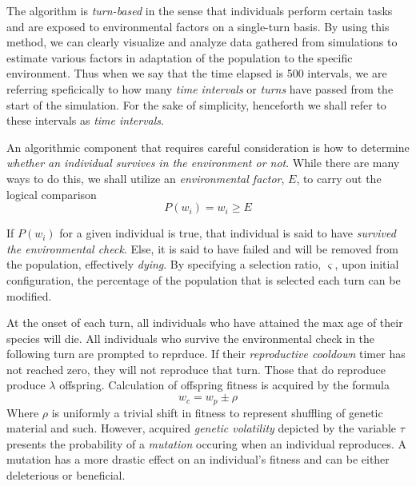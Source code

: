 \documentclass{article}
\begin{document}
    \par \noindent The algorithm is \emph{turn-based} in the sense that individuals perform certain tasks and are exposed to environmental factors on a single-turn basis. By using this method, we can clearly visualize and analyze data gathered from simulations to estimate various factors in adaptation of the population to the specific environment. Thus when we say that the time elapsed is 500 intervals, we are referring speficically to how many \emph{time intervals} or \emph{turns} have passed from the start of the simulation. For the sake of simplicity, henceforth we shall refer to these intervals as \emph{time intervals}.
    \par An algorithmic component that requires careful consideration is how to determine \emph{whether an individual survives in the environment or not}. While there are many ways to do this, we shall utilize an \emph{environmental factor}, $E$, to carry out the logical comparison
    \begin{equation}
        P(w_i) = w_i \geq E
    \end{equation}
    \par \noindent If $P(w_i)$ for a given individual is true, that individual is said to have \emph{survived the environmental check}. Else, it is said to have failed and will be removed from the population, effectively \emph{dying}. By specifying a selection ratio, $\varsigma$, upon initial configuration, the percentage of the population that is selected each turn can be modified.
    \par At the onset of each turn, all individuals who have attained the max age of their species will die. All individuals who survive the environmental check in the following turn are prompted to reprduce. If their \emph{reproductive cooldown} timer has not reached zero, they will not reproduce that turn. Those that do reproduce produce $\lambda$ offspring. Calculation of offspring fitness is acquired by the formula
    \begin{equation}
        w_c = w_p \pm \rho
    \end{equation}
    Where $\rho$ is uniformly a trivial shift in fitness to represent shuffling of genetic material and such. However, acquired \emph{genetic volatility} depicted by the variable $\tau$ presents the probability of a \emph{mutation} occuring when an individual reproduces. A mutation has a more drastic effect on an individual's fitness and can be either deleterious or beneficial.
\end{document}
